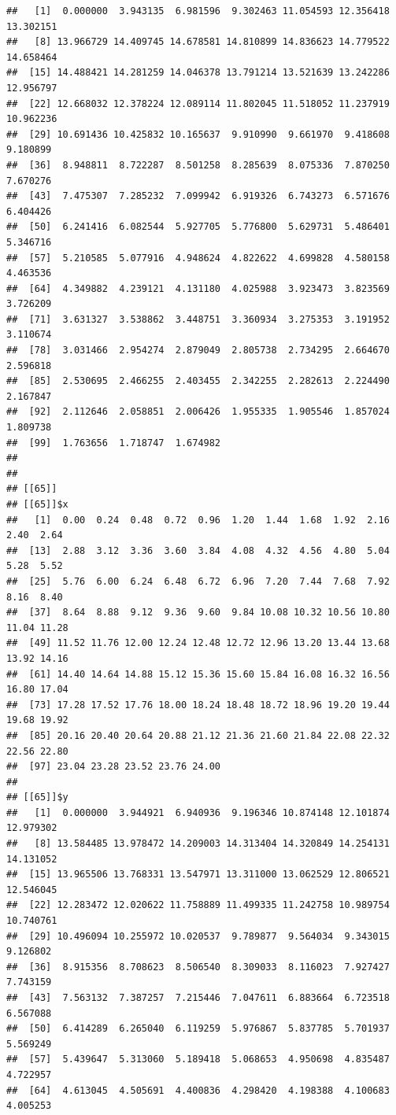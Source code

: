 \documentclass[
  ignorenonframetext,
]{beamer}
\begin{document}
\begin{frame}[fragile]{}
\begin{verbatim}
##   [1]  0.000000  3.943135  6.981596  9.302463 11.054593 12.356418 13.302151
##   [8] 13.966729 14.409745 14.678581 14.810899 14.836623 14.779522 14.658464
##  [15] 14.488421 14.281259 14.046378 13.791214 13.521639 13.242286 12.956797
##  [22] 12.668032 12.378224 12.089114 11.802045 11.518052 11.237919 10.962236
##  [29] 10.691436 10.425832 10.165637  9.910990  9.661970  9.418608  9.180899
##  [36]  8.948811  8.722287  8.501258  8.285639  8.075336  7.870250  7.670276
##  [43]  7.475307  7.285232  7.099942  6.919326  6.743273  6.571676  6.404426
##  [50]  6.241416  6.082544  5.927705  5.776800  5.629731  5.486401  5.346716
##  [57]  5.210585  5.077916  4.948624  4.822622  4.699828  4.580158  4.463536
##  [64]  4.349882  4.239121  4.131180  4.025988  3.923473  3.823569  3.726209
##  [71]  3.631327  3.538862  3.448751  3.360934  3.275353  3.191952  3.110674
##  [78]  3.031466  2.954274  2.879049  2.805738  2.734295  2.664670  2.596818
##  [85]  2.530695  2.466255  2.403455  2.342255  2.282613  2.224490  2.167847
##  [92]  2.112646  2.058851  2.006426  1.955335  1.905546  1.857024  1.809738
##  [99]  1.763656  1.718747  1.674982
## 
## 
## [[65]]
## [[65]]$x
##   [1]  0.00  0.24  0.48  0.72  0.96  1.20  1.44  1.68  1.92  2.16  2.40  2.64
##  [13]  2.88  3.12  3.36  3.60  3.84  4.08  4.32  4.56  4.80  5.04  5.28  5.52
##  [25]  5.76  6.00  6.24  6.48  6.72  6.96  7.20  7.44  7.68  7.92  8.16  8.40
##  [37]  8.64  8.88  9.12  9.36  9.60  9.84 10.08 10.32 10.56 10.80 11.04 11.28
##  [49] 11.52 11.76 12.00 12.24 12.48 12.72 12.96 13.20 13.44 13.68 13.92 14.16
##  [61] 14.40 14.64 14.88 15.12 15.36 15.60 15.84 16.08 16.32 16.56 16.80 17.04
##  [73] 17.28 17.52 17.76 18.00 18.24 18.48 18.72 18.96 19.20 19.44 19.68 19.92
##  [85] 20.16 20.40 20.64 20.88 21.12 21.36 21.60 21.84 22.08 22.32 22.56 22.80
##  [97] 23.04 23.28 23.52 23.76 24.00
## 
## [[65]]$y
##   [1]  0.000000  3.944921  6.940936  9.196346 10.874148 12.101874 12.979302
##   [8] 13.584485 13.978472 14.209003 14.313404 14.320849 14.254131 14.131052
##  [15] 13.965506 13.768331 13.547971 13.311000 13.062529 12.806521 12.546045
##  [22] 12.283472 12.020622 11.758889 11.499335 11.242758 10.989754 10.740761
##  [29] 10.496094 10.255972 10.020537  9.789877  9.564034  9.343015  9.126802
##  [36]  8.915356  8.708623  8.506540  8.309033  8.116023  7.927427  7.743159
##  [43]  7.563132  7.387257  7.215446  7.047611  6.883664  6.723518  6.567088
##  [50]  6.414289  6.265040  6.119259  5.976867  5.837785  5.701937  5.569249
##  [57]  5.439647  5.313060  5.189418  5.068653  4.950698  4.835487  4.722957
##  [64]  4.613045  4.505691  4.400836  4.298420  4.198388  4.100683  4.005253

\end{verbatim}
\end{frame}
\end{document}
